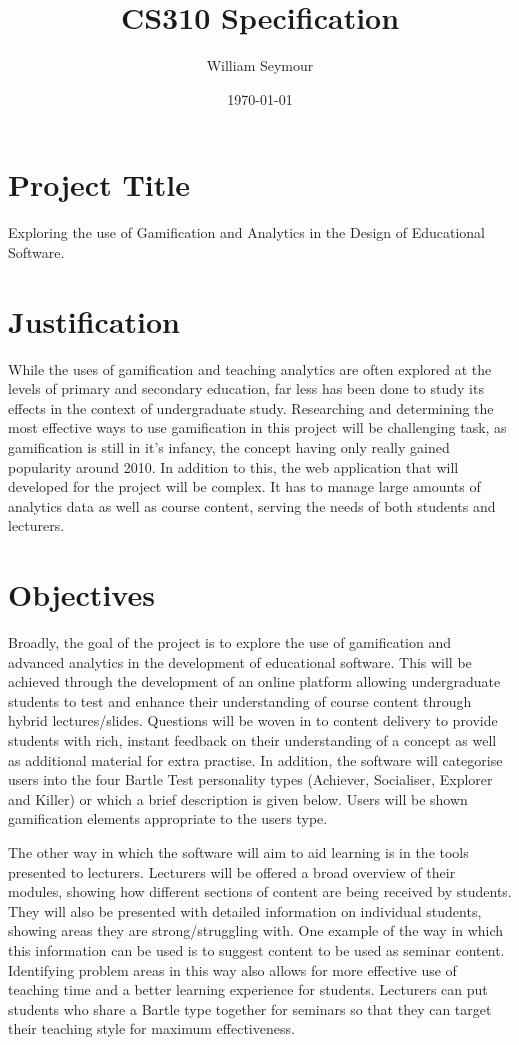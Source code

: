 \documentclass{report}
\begin{document}
\title{CS310 Specification}
\author{William Seymour}
\date{\today}
\maketitle

\section*{Project Title}
Exploring the use of Gamification and Analytics in the Design of Educational Software.
\section*{Justification}
While the uses of gamification and teaching analytics are often explored at the levels of primary and secondary education, far less has been done to study its effects in the context of undergraduate study. Researching and determining the most effective ways to use gamification in this project will be challenging task, as gamification is still in it's infancy, the concept having only really gained popularity around 2010. In addition to this, the web application that will developed for the project will be complex. It has to manage large amounts of analytics data as well as course content, serving the needs of both students and lecturers.
\section*{Objectives}
Broadly, the goal of the project is to explore the use of gamification and advanced analytics in the development of educational software. This will be achieved through the development of an online platform allowing undergraduate students to test and enhance their understanding of course content through hybrid lectures/slides. Questions will be woven in to content delivery to provide students with rich, instant feedback on their understanding of a concept as well as additional material for extra practise. In addition, the software will categorise users into the four Bartle Test personality types (Achiever, Socialiser, Explorer and Killer) or which a brief description is given below. Users will be shown gamification elements appropriate to the users type.

The other way in which the software will aim to aid learning is in the tools presented to lecturers. Lecturers will be offered a broad overview of their modules, showing how different sections of content are being received by students. They will also be presented with detailed information on individual students, showing areas they are strong/struggling with. One example of the way in which this information can be used is to suggest content to be used as seminar content. Identifying problem areas in this way also allows for more effective use of teaching time and a better learning experience for students. Lecturers can put students who share a Bartle type together for seminars so that they can target their teaching style for maximum effectiveness.
\end{document}

